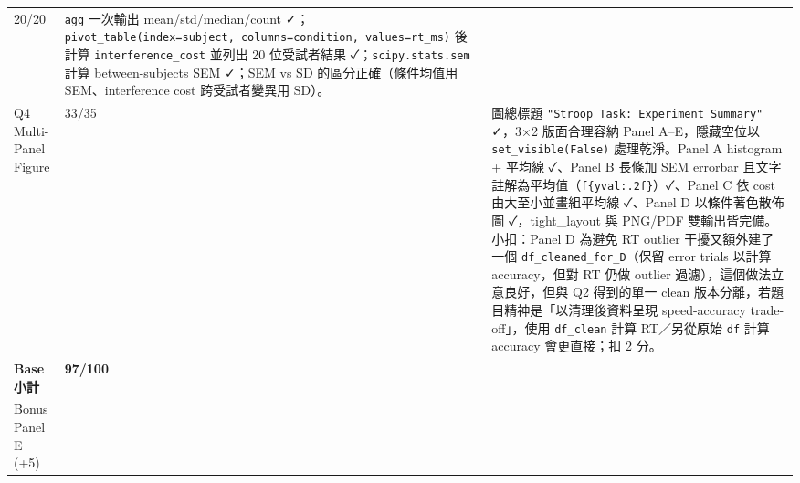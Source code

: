 \documentclass[
  14pt,
]{extarticle}
\begin{document}
\begin{longtable}[]{@{}lll@{}}
\begin{minipage}[t]{0.04\columnwidth}
20/20\strut
\end{minipage} & \begin{minipage}[t]{0.78\columnwidth}\raggedright
\texttt{agg} 一次輸出 mean/std/median/count
✓；\texttt{pivot\_table(index=\textquotesingle{}subject\textquotesingle{},\ columns=\textquotesingle{}condition\textquotesingle{},\ values=\textquotesingle{}rt\_ms\textquotesingle{})}
後計算 \texttt{interference\_cost} 並列出 20 位受試者結果
✓；\texttt{scipy.stats.sem} 計算 between-subjects SEM ✓；SEM vs SD
的區分正確（條件均值用 SEM、interference cost 跨受試者變異用
SD）。\strut
\end{minipage}\tabularnewline
\begin{minipage}[t]{0.10\columnwidth}\raggedright
Q4 Multi-Panel Figure\strut
\end{minipage} & \begin{minipage}[t]{0.04\columnwidth}\raggedright
33/35\strut
\end{minipage} & \begin{minipage}[t]{0.78\columnwidth}\raggedright
圖總標題 \texttt{"Stroop\ Task:\ Experiment\ Summary"} ✓，3×2
版面合理容納 Panel A--E，隱藏空位以 \texttt{set\_visible(False)}
處理乾淨。Panel A histogram + 平均線 ✓、Panel B 長條加 SEM errorbar
且文字註解為平均值（\texttt{f\textquotesingle{}\{yval:.2f\}\textquotesingle{}}）✓、Panel
C 依 cost 由大至小並畫組平均線 ✓、Panel D 以條件著色散佈圖
✓，tight\_layout 與 PNG/PDF 雙輸出皆完備。小扣：Panel D 為避免 RT
outlier 干擾又額外建了一個 \texttt{df\_cleaned\_for\_D}（保留 error
trials 以計算 accuracy，但對 RT 仍做 outlier
過濾），這個做法立意良好，但與 Q2 得到的單一 clean
版本分離，若題目精神是「以清理後資料呈現 speed-accuracy
trade-off」，使用 \texttt{df\_clean} 計算 RT／另從原始 \texttt{df} 計算
accuracy 會更直接；扣 2 分。\strut
\end{minipage}\tabularnewline
\begin{minipage}[t]{0.10\columnwidth}\raggedright
\textbf{Base 小計}\strut
\end{minipage} & \begin{minipage}[t]{0.04\columnwidth}\raggedright
\textbf{97/100}\strut
\end{minipage} & \begin{minipage}[t]{0.78\columnwidth}\raggedright
\strut
\end{minipage}\tabularnewline
\begin{minipage}[t]{0.10\columnwidth}\raggedright
Bonus Panel E (+5)\strut
\end{minipage} & \begin{minipage}[t]{0.04\columnwidth}\raggedright

\end{minipage}
\end{longtable}
\end{document}
